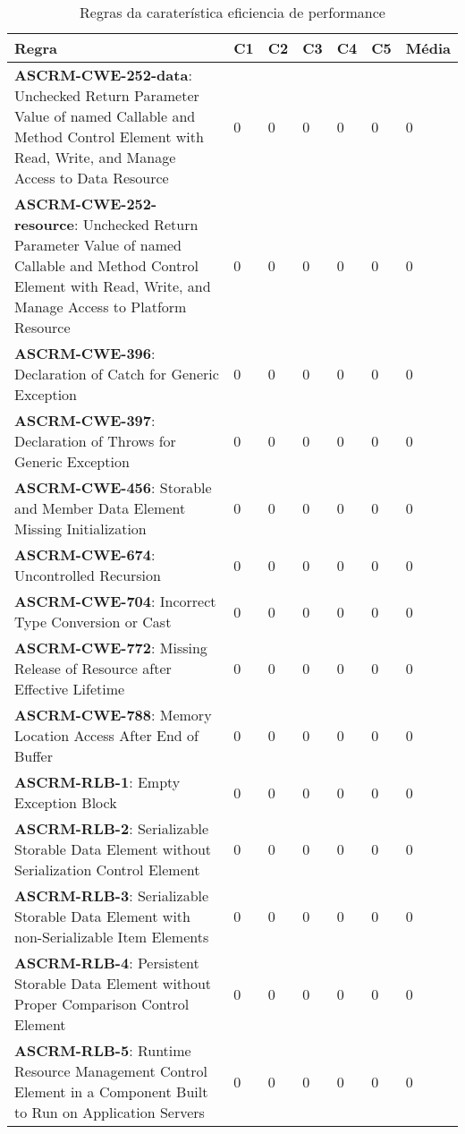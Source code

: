 \documentclass[openany,10pt,a4paper]{article}
\begin{document}
\begin{table}[h]
	\centering
	\caption{Regras da caraterística eficiencia de performance}
	\begin{tabular}{|p{3in}|p{0.3in}|p{0.3in}|p{0.3in}|p{0.3in}|p{0.3in}|p{0.4in}|}
		\hline	
		\textbf{Regra} & \textbf{C1} & \textbf{C2} & \textbf{C3} & \textbf{C4} & \textbf{C5} & \textbf{Média} \\ \hline
		\textbf{ASCRM-CWE-252-data}: Unchecked Return Parameter Value of named Callable and Method Control Element with Read, Write, and Manage Access to Data Resource & 0 & 0 & 0 & 0 & 0 & 0 \\ \hline
\textbf{ASCRM-CWE-252-resource}: Unchecked Return Parameter Value of named Callable and Method Control Element with Read, Write, and Manage Access to Platform Resource & 0 & 0 & 0 & 0 & 0 & 0 \\ \hline
\textbf{ASCRM-CWE-396}: Declaration of Catch for Generic Exception & 0 & 0 & 0 & 0 & 0 & 0 \\ \hline
\textbf{ASCRM-CWE-397}: Declaration of Throws for Generic Exception & 0 & 0 & 0 & 0 & 0 & 0 \\ \hline
\textbf{ASCRM-CWE-456}: Storable and Member Data Element Missing Initialization & 0 & 0 & 0 & 0 & 0 & 0 \\ \hline
\textbf{ASCRM-CWE-674}: Uncontrolled Recursion & 0 & 0 & 0 & 0 & 0 & 0 \\ \hline
\textbf{ASCRM-CWE-704}: Incorrect Type Conversion or Cast & 0 & 0 & 0 & 0 & 0 & 0 \\ \hline
\textbf{ASCRM-CWE-772}: Missing Release of Resource after Effective Lifetime & 0 & 0 & 0 & 0 & 0 & 0 \\ \hline
\textbf{ASCRM-CWE-788}: Memory Location Access After End of Buffer & 0 & 0 & 0 & 0 & 0 & 0 \\ \hline
\textbf{ASCRM-RLB-1}: Empty Exception Block & 0 & 0 & 0 & 0 & 0 & 0 \\ \hline
\textbf{ASCRM-RLB-2}: Serializable Storable Data Element without Serialization Control Element & 0 & 0 & 0 & 0 & 0 & 0 \\ \hline
\textbf{ASCRM-RLB-3}: Serializable Storable Data Element with non-Serializable Item Elements & 0 & 0 & 0 & 0 & 0 & 0 \\ \hline
\textbf{ASCRM-RLB-4}: Persistent Storable Data Element without Proper Comparison Control Element & 0 & 0 & 0 & 0 & 0 & 0 \\ \hline
\textbf{ASCRM-RLB-5}: Runtime Resource Management Control Element in a Component Built to Run on Application Servers & 0 & 0 & 0 & 0 & 0 & 0 \\ \hline

\end{tabular}
\end{table}
\end{document}
